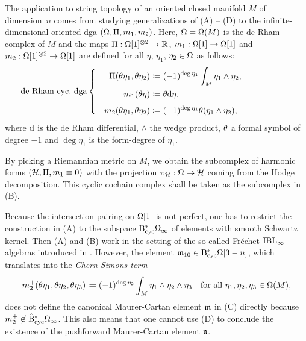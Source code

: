 \documentclass[\MainFolder/Text.tex]{subfiles}
\begin{document}
The application to string topology of an oriented closed manifold $M$ of dimension~$n$ comes from studying generalizations of (A) -- (D) to the infinite-dimensional oriented dga $(\Omega,\allowbreak \Pi,\allowbreak m_1,\allowbreak m_2)$. Here, $\Omega = \Omega(M)$ is the de Rham complex of $M$ and the maps $\Pi: \Omega[1]^{\otimes 2} \rightarrow \mathbb{R}$, $m_1: \Omega[1]\rightarrow \Omega[1]$ and $m_2: \Omega[1]^{\otimes 2} \rightarrow \Omega[1]$ are defined for all $\eta$, $\eta_1$, $\eta_2 \in \Omega$ as follows:
\begin{equation} \label{Eq:DeRhamDGA}
 \qquad \mathllap{\text{de Rham cyc.~dga}}\left\{ \begin{aligned}
 \Pair(\SuspU\eta_1,\SuspU\eta_2) &\coloneqq (-1)^{\deg \eta_1} \int_M \eta_1\wedge \eta_2, \\ 
 m_1(\SuspU\eta) &\coloneqq \SuspU \Dd \eta,\\[\jot] 
 \quad m_2(\SuspU\eta_1,\SuspU\eta_2) &\coloneqq (-1)^{\deg \eta_1} \SuspU(\eta_1\wedge\eta_2), \end{aligned}\right.
\end{equation}
where $\mathrm{d}$ is the de Rham differential, $\wedge$ the wedge product, $\theta$ a formal symbol of degree $-1$ and $\deg \eta_1$ is the form-degree of $\eta_1$.

By picking a Riemannian metric on $M$, we obtain the subcomplex of harmonic forms $(\mathcal{H}, \Pi, m_1 \equiv 0)$ with the projection $\pi_{\mathcal{H}}: \Omega \rightarrow \mathcal{H}$ coming from the Hodge decomposition.
This cyclic cochain complex shall be taken as the subcomplex in (B).

Because the intersection pairing on $\Omega[1]$ is not perfect, one has to restrict the construction in (A) to the subspace $\mathrm{B}_{\mathrm{cyc}}^* \Omega_\infty$ of elements with smooth Schwartz kernel.
Then (A) and (B) work in the setting of the so called Fr\'echet $\mathrm{IBL}_\infty$-algebras introduced in \cite[Section 13]{Cieliebak2015}.
However, the element $\mathfrak{m}_{10} \in \mathrm{B}_{\mathrm{cyc}}^* \Omega[3-n]$, which translates into the \emph{Chern-Simons term}
\begin{equation} \label{Eq:ChernSimons}
 m_2^+(\theta\eta_1,\theta\eta_2,\theta\eta_3) \coloneqq (-1)^{\deg \eta_2}  \int_M \eta_1\wedge \eta_2\wedge\eta_3\quad\text{for all }\eta_1, \eta_2, \eta_3 \in \Omega(M),
\end{equation}
does not define the canonical Maurer-Cartan element $\mathfrak{m}$ in (C) directly because $m_2^+ \not\in \hat{\mathrm{B}}_{\mathrm{cyc}}^* \Omega_\infty$.
This also means that one cannot use (D) to conclude the existence of the pushforward Maurer-Cartan element $\mathfrak{n}$.
\end{document}
